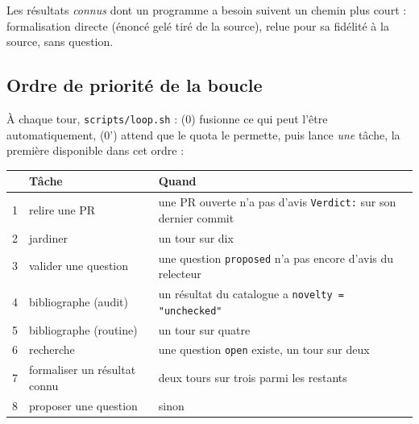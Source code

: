 \documentclass[11pt,a4paper]{article}
\newcommand{\cmd}[1]{\texttt{#1}}
\begin{document}
\begin{center}
\end{center}

Les résultats \emph{connus} dont un programme a besoin suivent un chemin plus court : formalisation
directe (énoncé gelé tiré de la source), relue pour sa fidélité à la source, sans question.

\subsection*{Ordre de priorité de la boucle}

À chaque tour, \cmd{scripts/loop.sh} : (0) fusionne ce qui peut l'être automatiquement, (0') attend
que le quota le permette, puis lance \emph{une} tâche, la première disponible dans cet ordre :

\begin{center}
\begin{tabularx}{\linewidth}{@{}rlL@{}}
\toprule
& Tâche & Quand \\
 & relire une PR & une PR ouverte n'a pas d'avis \cmd{Verdict:} sur son dernier commit \\
2 & jardiner & un tour sur dix \\
3 & valider une question & une question \cmd{proposed} n'a pas encore d'avis du relecteur \\
4 & bibliographe (audit) & un résultat du catalogue a \cmd{novelty = "unchecked"} \\
5 & bibliographe (routine) & un tour sur quatre \\
6 & recherche & une question \cmd{open} existe, un tour sur deux \\
7 & formaliser un résultat connu & deux tours sur trois parmi les restants \\
8 & proposer une question & sinon \\
\bottomrule
\end{tabularx}
\end{center}
\end{document}
